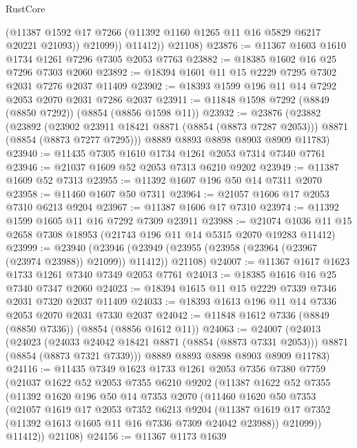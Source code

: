\begin{lexlean}{RustCore}
\begin{coremodule}
              (@11387 @1592 @17 @7266 (@11392 @1160 @1265 @11 @16 @5829 @6217 @20221 @21093))
              @21099))
          @11412))
      @21108)
@23876 := @11367 @1603 @1610 @1734 @1261 @7296 @7305 @2053 @7763
@23882 := @18385 @1602 @16 @25 @7296 @7303 @2060
@23892 := @18394 @1601 @11 @15 @2229 @7295 @7302 @2031 @7276 @2037 @11409
@23902 := @18393 @1599 @196 @11 @14 @7292 @2053 @2070 @2031 @7286 @2037
@23911 := @11848 @1598 @7292 (@8849 (@8850 @7292)) (@8854 (@8856 @1598 @11))
@23932 := @23876
    (@23882
      (@23892
        (@23902 @23911 @18421 @8871 (@8854 (@8873 @7287 @2053)))
        @8871
        (@8854 (@8873 @7277 @7295)))
      @8889
      @8893
      @8898
      @8903
      @8909
      @11783)
@23940 := @11435 @7305 @1610 @1734 @1261 @2053 @7314 @7340 @7761
@23946 := @21037 @1609 @52 @2053 @7313 @6210 @9202
@23949 := @11387 @1609 @52 @7313
@23955 := @11392 @1607 @196 @50 @14 @7311 @2070
@23958 := @11460 @1607 @50 @7311
@23964 := @21057 @1606 @17 @2053 @7310 @6213 @9204
@23967 := @11387 @1606 @17 @7310
@23974 := @11392 @1599 @1605 @11 @16 @7292 @7309 @23911
@23988 := @21074 @1036 @11 @15 @2658 @7308 @18953 (@21743 @196 @11 @14 @5315 @2070 @19283 @11412)
@23999 := @23940
    (@23946 (@23949 (@23955 (@23958 (@23964 (@23967 (@23974 @23988)) @21099)) @11412)) @21108)
@24007 := @11367 @1617 @1623 @1733 @1261 @7340 @7349 @2053 @7761
@24013 := @18385 @1616 @16 @25 @7340 @7347 @2060
@24023 := @18394 @1615 @11 @15 @2229 @7339 @7346 @2031 @7320 @2037 @11409
@24033 := @18393 @1613 @196 @11 @14 @7336 @2053 @2070 @2031 @7330 @2037
@24042 := @11848 @1612 @7336 (@8849 (@8850 @7336)) (@8854 (@8856 @1612 @11))
@24063 := @24007
    (@24013
      (@24023
        (@24033 @24042 @18421 @8871 (@8854 (@8873 @7331 @2053)))
        @8871
        (@8854 (@8873 @7321 @7339)))
      @8889
      @8893
      @8898
      @8903
      @8909
      @11783)
@24116 := @11435
    @7349
    @1623
    @1733
    @1261
    @2053
    @7356
    @7380
    @7759
    (@21037
      @1622
      @52
      @2053
      @7355
      @6210
      @9202
      (@11387
        @1622
        @52
        @7355
        (@11392
          @1620
          @196
          @50
          @14
          @7353
          @2070
          (@11460
            @1620
            @50
            @7353
            (@21057
              @1619
              @17
              @2053
              @7352
              @6213
              @9204
              (@11387 @1619 @17 @7352 (@11392 @1613 @1605 @11 @16 @7336 @7309 @24042 @23988))
              @21099))
          @11412))
      @21108)
@24156 := @11367
    @1173
    @1639

\end{coremodule}
\end{lexlean}
